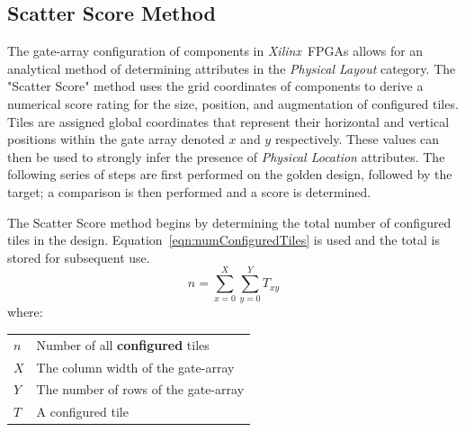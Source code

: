 \documentclass[conference]{IEEEtran}
\makeatletter
\newcommand{\Xilinx}{\textit{\gls{Xilinx}}~}
\newenvironment{conditions}
{\par\vspace{\abovedisplayskip}\noindent\begin{tabular}{>{$}l<{$} @{${}={}$} l}}
	{\end{tabular}\par\vspace{\belowdisplayskip}}
\makeatother
\begin{document}
\subsection{Scatter Score Method} \label{sec:scatterScore}
The gate-array configuration of components in \Xilinx \acrshort{FPGA}s allows for an analytical method of determining attributes in the \textit{Physical Layout} category.
The "Scatter Score" method uses the grid coordinates of components to derive a numerical score rating for the size, position, and augmentation of configured tiles.
Tiles are assigned global coordinates that represent their horizontal and vertical positions within the gate array denoted $x$ and $y$ respectively. 
These values can then be used to strongly infer the presence of \textit{Physical Location} attributes.
The following series of steps are first performed on the \gls{golden} design, followed by the \gls{target}; a comparison is then performed and a score is determined.

The Scatter Score method begins by determining the total number of configured tiles in the design.
Equation~\ref{eqn:numConfiguredTiles} is used and the total is stored for subsequent use.
\begin{equation} \label{eqn:numConfiguredTiles}
n = \sum_{x = 0}^{X}\sum_{y = 0}^{Y}T_{xy}
\end{equation}
where:
\begin{conditions}
	n     &  Number of all \textbf{configured} tiles \\
	X     &  The column width of the gate-array \\   
	Y     &  The number of rows of the gate-array \\
	T     &  A configured tile
\end{conditions}
\end{document}
